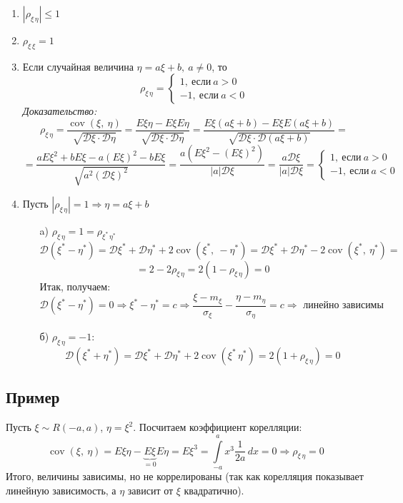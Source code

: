 \documentclass[12pt, a4paper]{article}
\begin{document}
    \begin{enumerate}
        \item $|\rho_{\xi\, \eta}| \leq 1$
        \item $\rho_{\xi\, \xi} = 1$
        \item Если случайная величина $\eta = a\xi + b,\ a\neq 0$, то
        \[\rho_{\xi\, \eta} = \begin{cases}
            1,\ \text{если}\ a > 0\\
            -1,\ \text{если}\ a < 0
        \end{cases}\]
        \textit{Доказательство:}
        \[\rho_{\xi\, \eta} = \frac{\operatorname{cov}(\xi,\ \eta)}{\sqrt{\mathcal{D}\xi\cdot \mathcal{D}\eta}} = \frac{E\xi\eta - E\xi E\eta}{\sqrt{\mathcal{D}\xi\cdot \mathcal{D}\eta}} = \frac{E\xi(a\xi + b) - E\xi E(a\xi + b)}{\sqrt{\mathcal{D}\xi\cdot \mathcal{D}(a\xi + b)}} =\]
        \[=\frac{aE\xi^2 + bE\xi - a(E\xi)^2 - bE\xi}{\sqrt{a^2(\mathcal{D}\xi)^2}} = \frac{a(E\xi^2 - (E\xi)^2)}{|a|\mathcal{D}\xi} = \frac{a\mathcal{D}\xi}{|a|\mathcal{D}\xi} = \begin{cases}
            1,\ \text{если}\ a > 0\\
            -1,\ \text{если}\ a < 0
        \end{cases}\]
        \item Пусть $|\rho_{\xi\, \eta}| = 1\Rightarrow \eta = a\xi + b$
        \begin{enumerate}
            \item[a)] $\rho_{\xi\, \eta} = 1 = \rho_{\xi^*\, \eta^*}$\\
            \[\mathcal{D}(\xi^* - \eta^*) = \mathcal{D}\xi^* + \mathcal{D}\eta^* + 2\operatorname{cov}(\xi^*,\ -\eta^*) = \mathcal{D}\xi^* + \mathcal{D}\eta^* - 2\operatorname{cov}(\xi^*,\ \eta^*) =\]
            \[= 2 - 2\rho_{\xi\, \eta} = 2(1 - \rho_{\xi\, \eta}) = 0\]
            Итак, получаем:
            \[\mathcal{D}(\xi^* - \eta^*) = 0 \Rightarrow \xi^* - \eta^* = c\Rightarrow \frac{\xi - m_{\xi}}{\sigma_{\xi}} - \frac{\eta - m_{\eta}}{\sigma_{\eta}} = c\Rightarrow \text{ линейно зависимы}\]
            \item[б)] $\rho_{\xi\, \eta} = -1$:
            \[\mathcal{D}(\xi^* + \eta^*) = \mathcal{D}\xi^* + \mathcal{D}\eta^* + 2\operatorname{cov}(\xi^*\, \eta^*) = 2(1 + \rho_{\xi\, \eta}) = 0\]
        \end{enumerate}
    \end{enumerate}
    \subsection*{Пример}
    Пусть $\xi \sim R(-a, a)$, $\eta = \xi^2$. Посчитаем коэффициент корелляции:
    \[\operatorname{cov}(\xi,\ \eta) = E\xi \eta - \underset{=0}{\underbrace{E\xi}} E\eta = E\xi^3 = \int\limits_{-a}^{a} x^3 \frac{1}{2a}\, dx = 0\Rightarrow \rho_{\xi\, \eta} = 0\]
    Итого, величины зависимы, но не коррелированы (так как корелляция показывает линейную зависимость, а $\eta$ зависит от $\xi$ квадратично).
\end{document}
